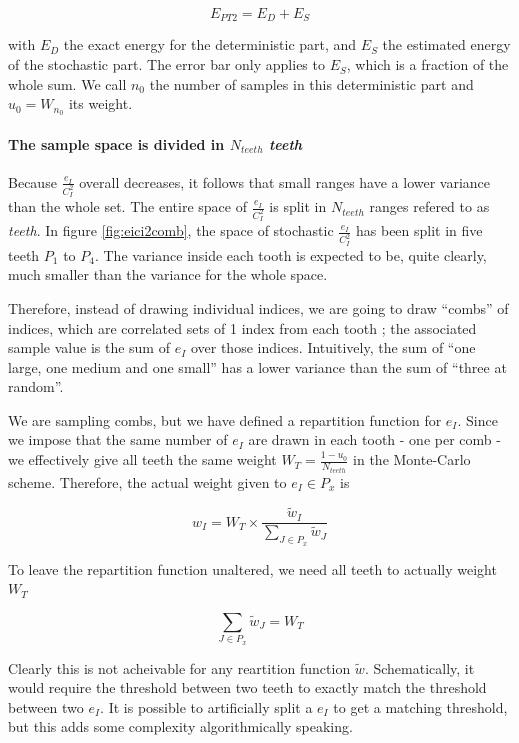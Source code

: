 \documentclass[./thesis.tex]{subfiles}
\begin{document}
\begin{equation}
E_{PT2} = E_D + E_S
\end{equation}

with $E_D$ the exact energy for the deterministic part, and $E_S$ the estimated energy of the stochastic part. The error bar only applies to $E_S$, which is a fraction of the whole sum.
We call $n_0$ the number of samples in this deterministic part and $u_0 = W_{n_0}$ its weight.



\paragraph{The sample space is divided in $N_{teeth}$ \emph{teeth}}

Because $\frac{e_I}{C_I^2}$ overall decreases, it follows that small ranges have a lower variance than the whole set. The entire space of $\frac{e_I}{C_I^2}$ is split in $N_{teeth}$ ranges refered to as \emph{teeth}. In figure \ref{fig:eici2comb}, the space of stochastic $\frac{e_I}{C_I^2}$ has been split in \alert{five teeth $P_1$ to $P_4$}. The variance inside each tooth is expected to be, quite clearly, much smaller than the variance for the whole space.

Therefore, instead of drawing individual indices, we are going to draw ``combs'' of indices, which are correlated sets of 1 index from each tooth ; the associated sample value is the sum of $e_I$ over those indices. Intuitively, the sum of ``one large, one medium and one small'' has a lower variance than the sum of ``three at random''.

We are sampling combs, but we have defined a repartition function for $e_I$. Since we impose that the same number of $e_I$ are drawn in each tooth - one per comb - we effectively give all teeth the same weight $W_T=\frac{1-u_0}{N_{teeth}}$ in the Monte-Carlo scheme. Therefore, the actual weight given to $e_I \in P_x$ is

\begin{equation}
w_I = W_T \times \frac{\tilde w_I}{\sum_{J \in P_x} \tilde w_J}
\end{equation}

To leave the repartition function unaltered, we need all teeth to actually weight $W_T$

\begin{equation}
\sum_{J \in P_x} \tilde w_J = W_T
\end{equation}

Clearly this is not acheivable for any reartition function $\tilde w$. Schematically, it would require the threshold between two teeth to exactly match the threshold between two $e_I$. It is possible to artificially split a $e_I$ to get a matching threshold, but this adds some complexity algorithmically speaking.
\end{document}
